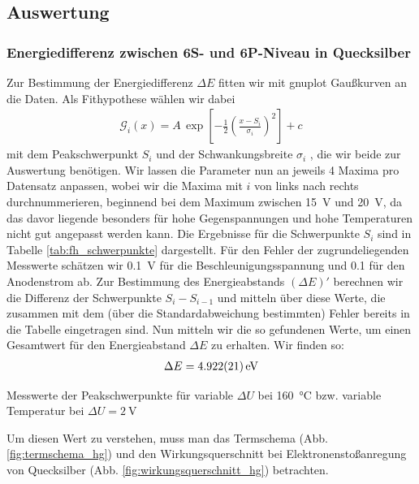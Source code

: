 \documentclass[11pt, a4paper]{article}
\begin{document}
\subsection{Auswertung}

\subsubsection{Energiedifferenz zwischen 6S- und 6P-Niveau in Quecksilber}

Zur Bestimmung der Energiedifferenz $\Delta E$ fitten wir mit gnuplot Gaußkurven an die Daten.
Als Fithypothese wählen wir dabei
\begin{align}
\mathcal{G}_i(x)=A\,\exp\left[-\frac{1}{2}\left(\frac{x-S_i}{\sigma_i}\right)^2\right] + c
\label{eq:fh_fithypothese}
\end{align}
mit dem Peakschwerpunkt $S_i$ und der Schwankungsbreite $\sigma_i$ , die wir beide zur Auswertung benötigen.
Wir lassen die Parameter nun an jeweils 4 Maxima pro Datensatz anpassen, wobei wir die Maxima mit $i$ von links nach rechts durchnummerieren, beginnend bei dem Maximum zwischen \SI{15}{\volt} und \SI{20}{\volt}, da das davor liegende besonders für hohe Gegenspannungen und hohe Temperaturen nicht gut angepasst werden kann.
Die Ergebnisse für die Schwerpunkte $S_i$ sind in Tabelle \ref{tab:fh_schwerpunkte} dargestellt.
Für den Fehler der zugrundeliegenden Messwerte schätzen wir \SI{0.1}{\volt} für die Beschleunigungsspannung und \num{0.1} für den Anodenstrom ab.
Zur Bestimmung des Energieabstands $\left(\Delta E\right)'$ berechnen wir die Differenz der Schwerpunkte $S_i-S_{i-1}$ und mitteln über diese Werte, die zusammen mit dem (über die Standardabweichung bestimmten) Fehler bereits in die Tabelle eingetragen sind.
Nun mitteln wir die so gefundenen Werte, um einen Gesamtwert für den Energieabstand $\Delta E$ zu erhalten.
Wir finden so:
\begin{align*}
\Delta E = \SI{4.922+-0.021}{\electronvolt}
\end{align*}
\begin{table}[h]
\centering
\resizebox{\columnwidth}{!}{%
}
\caption{Messwerte der Peakschwerpunkte für variable $\Delta U$ bei \SI{160}{\degreeCelsius} bzw. variable Temperatur bei $\Delta U=\SI{2}{\volt}$}
\label{tab:fh_schwerpunkte}
\end{table}
Um diesen Wert zu verstehen, muss man das Termschema (Abb. \ref{fig:termschema_hg}) und den Wirkungsquerschnitt bei Elektronenstoßanregung von Quecksilber (Abb. \ref{fig:wirkungsquerschnitt_hg}) betrachten.
\end{document}
